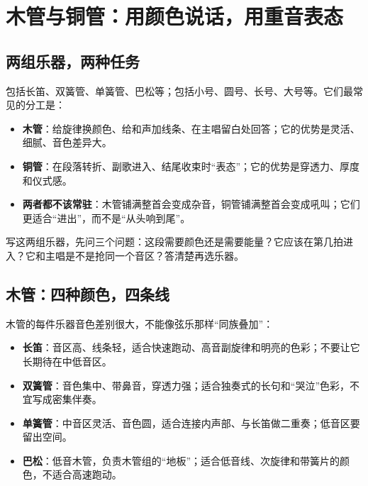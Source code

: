 \chapter{木管与铜管：用颜色说话，用重音表态}
\label{ch:winds-brass}


\section{两组乐器，两种任务}
\label{sec:winds-jobs}

包括长笛、双簧管、单簧管、巴松等；包括小号、圆号、长号、大号等。它们最常见的分工是：

\begin{itemize}
\item \textbf{木管}：给旋律换颜色、给和声加线条、在主唱留白处回答；它的优势是灵活、细腻、音色差异大。
\item \textbf{铜管}：在段落转折、副歌进入、结尾收束时“表态”；它的优势是穿透力、厚度和仪式感。
\item \textbf{两者都不该常驻}：木管铺满整首会变成杂音，铜管铺满整首会变成吼叫；它们更适合“进出”，而不是“从头响到尾”。
\end{itemize}

写这两组乐器，先问三个问题：这段需要颜色还是需要能量？它应该在第几拍进入？它和主唱是不是抢同一个音区？答清楚再选乐器。

\section{木管：四种颜色，四条线}
\label{sec:woodwinds}

木管的每件乐器音色差别很大，不能像弦乐那样“同族叠加”：

\begin{itemize}
\item \textbf{长笛}：音区高、线条轻，适合快速跑动、高音副旋律和明亮的色彩；不要让它长期待在中低音区。
\item \textbf{双簧管}：音色集中、带鼻音，穿透力强；适合独奏式的长句和“哭泣”色彩，不宜写成密集伴奏。
\item \textbf{单簧管}：中音区灵活、音色圆，适合连接内声部、与长笛做二重奏；低音区要留出空间。
\item \textbf{巴松}：低音木管，负责木管组的“地板”；适合低音线、次旋律和带簧片的颜色，不适合高速跑动。
\end{itemize}

